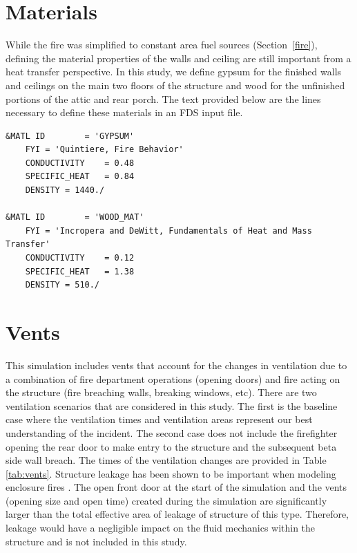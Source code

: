 \documentclass[11pt,oneside]{book}
\begin{document}
\section{Materials}
\label{matl}
While the fire was simplified to constant area fuel sources (Section~\ref{fire}), defining the material properties of the walls and ceiling are still important from a heat transfer perspective. In this study, we define gypsum \cite{Quintiere:2} for the finished walls and ceilings on the main two floors of the structure and wood \cite{Incropera:1} for the unfinished portions of the attic and rear porch. The text provided below are the lines necessary to define these materials in an FDS input file.

\begin{lstlisting}
&MATL ID        = 'GYPSUM'
    FYI = 'Quintiere, Fire Behavior' 
    CONDUCTIVITY    = 0.48
    SPECIFIC_HEAT   = 0.84
    DENSITY = 1440./

&MATL ID        = 'WOOD_MAT'
    FYI = 'Incropera and DeWitt, Fundamentals of Heat and Mass Transfer'
    CONDUCTIVITY    = 0.12
    SPECIFIC_HEAT   = 1.38
    DENSITY = 510./ 
\end{lstlisting}

\section{Vents}
\label{Vents}
This simulation includes vents that account for the changes in ventilation due to a combination of fire department operations (opening doors) and fire acting on the structure (fire breaching walls, breaking windows, etc). There are two ventilation scenarios that are considered in this study. The first is the baseline case where the ventilation times and ventilation areas represent our best understanding of the incident. The second case does not include the firefighter opening the rear door to make entry to the structure and the subsequent beta side wall breach. The times of the ventilation changes are provided in Table \ref{tab:vents}. Structure leakage has been shown to be important when modeling enclosure fires \cite{beal2009}. The open front door at the start of the simulation and the vents (opening size and open time) created during the simulation are significantly larger than the total effective area of leakage of structure of this type. Therefore, leakage would have a negligible impact on the fluid mechanics within the structure and is not included in this study.
\end{document}
